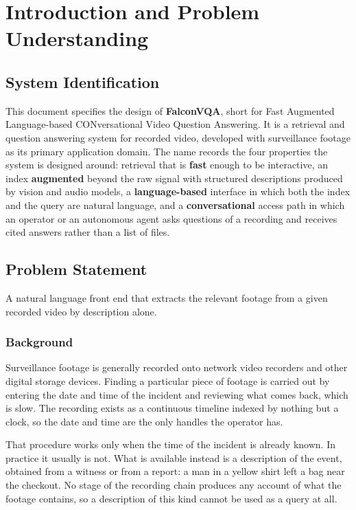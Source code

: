 \section{Introduction and Problem Understanding}

\subsection{System Identification}

This document specifies the design of \textbf{FalconVQA}, short for Fast Augmented
Language-based CONversational Video Question Answering. It is a retrieval and question
answering system for recorded video, developed with surveillance footage as its
primary application domain. The name records the four properties the system is
designed around: retrieval that is \textbf{fast} enough to be interactive, an index
\textbf{augmented} beyond the raw signal with structured descriptions produced by vision
and audio models, a \textbf{language-based} interface in which both the index and the
query are natural language, and a \textbf{conversational} access path in which an
operator or an autonomous agent asks questions of a recording and receives cited
answers rather than a list of files.

\subsection{Problem Statement}

A natural language front end that extracts the relevant footage from a given recorded
video by description alone.

\subsubsection*{Background}

Surveillance footage is generally recorded onto network video recorders and other
digital storage devices. Finding a particular piece of footage is carried out by
entering the date and time of the incident and reviewing what comes back, which is
slow. The recording exists as a continuous timeline indexed by nothing but a clock, so
the date and time are the only handles the operator has.

That procedure works only when the time of the incident is already known. In practice it
usually is not. What is available instead is a description of the event, obtained from a
witness or from a report: a man in a yellow shirt left a bag near the checkout. No stage
of the recording chain produces any account of what the footage contains, so a
description of this kind cannot be used as a query at all.

